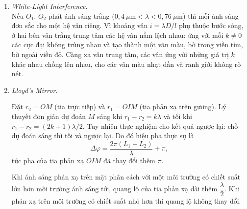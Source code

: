 \begin{enumerate}
\item \textit{White-Light Interference.}\\
Nếu $O_1$, $O_2$ phát ánh sáng trắng ($0{,}4\ \mu\text{m} < \lambda < 0{,}76\ \mu\text{m}$) thì mỗi ánh sáng đơn sắc cho một hệ vân riêng. Vì khoảng vân $i = \lambda D/l$ phụ thuộc bước sóng, ở hai bên vân trắng trung tâm các hệ vân nằm lệch nhau: ứng với mỗi $k \neq 0$ các cực đại không trùng nhau và tạo thành một vân màu, bờ trong viền tím, bờ ngoài viền đỏ. Càng xa vân trung tâm, các vân ứng với những giá trị $k$ khác nhau chồng lên nhau, cho các vân màu nhạt dần và ranh giới không rõ nét.

\item \textit{Lloyd's Mirror.}\\
\begin{figure}[htbp]
    \centering
\end{figure}
Đặt $r_2 = OM$ (tia trực tiếp) và $r_1 = OIM$ (tia phản xạ trên gương). Lý thuyết đơn giản dự đoán $M$ sáng khi $r_1 - r_2 = k\lambda$ và tối khi $r_1 - r_2 = (2k+1)\lambda/2$. Tuy nhiên thực nghiệm cho kết quả ngược lại: chỗ dự đoán sáng thì tối và ngược lại. Do đó hiệu pha thực sự là
\[
\Delta\varphi = \frac{2\pi(L_1 - L_2)}{\lambda} + \pi,
\]
tức pha của tia phản xạ $OIM$ đã thay đổi thêm $\pi$.
\begin{theorem}
Khi ánh sáng phản xạ trên mặt phân cách với một môi trường có chiết suất lớn hơn môi trường ánh sáng tới, quang lộ của tia phản xạ dài thêm $\dfrac{\lambda}{2}$. Khi phản xạ trên môi trường có chiết suất nhỏ hơn thì quang lộ không thay đổi.
\end{theorem}


\end{enumerate}
